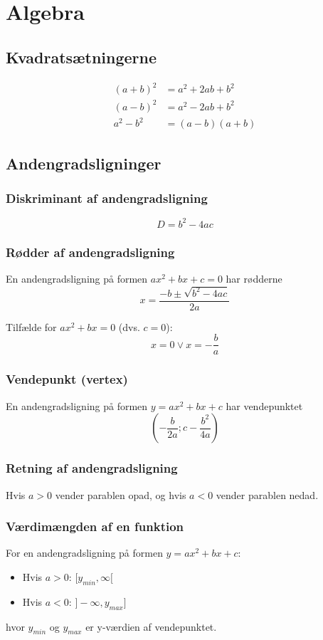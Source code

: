 \section{Algebra}
\subsection{Kvadratsætningerne}
\begin{align*}
    (a+b)^2 &= a^2 + 2ab + b^2 \\
    (a-b)^2 &= a^2 - 2ab + b^2 \\
    a^2 - b^2 &= (a-b)(a+b)
\end{align*}

\subsection{Andengradsligninger}

\subsubsection{Diskriminant af andengradsligning}
\[
    D = b^2 - 4ac
\]

\subsubsection{Rødder af andengradsligning}
En andengradsligning på formen \( a x^2 + b x + c = 0 \) har rødderne
\[
    x = \frac{-b \pm \sqrt{b^2 - 4ac}}{2a}
\]

Tilfælde for \(ax^2 + bx = 0 \) (dvs. \( c = 0 \)):
\[
    x = 0 \lor x = -\frac{b}{a}
\]

\subsubsection{Vendepunkt (vertex)}
En andengradsligning på formen \( y = a x^2 + b x + c \) har vendepunktet
\[
    \left( -\frac{b}{2a}; c - \frac{b^2}{4a} \right)
\]

\subsubsection{Retning af andengradsligning}
Hvis \( a > 0 \) vender parablen opad, og hvis \( a < 0 \) vender parablen nedad.

\subsubsection{Værdimængden af en funktion}
For en andengradsligning på formen \( y = a x^2 + b x + c \):
\begin{itemize}
    \item Hvis \( a > 0 \): \( [y_{min}, \infty[ \)
    \item Hvis \( a < 0 \): \( ]-\infty, y_{max}] \)
\end{itemize}
hvor \( y_{min} \) og \( y_{max} \) er y-værdien af vendepunktet.